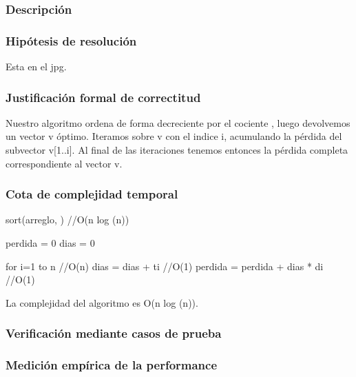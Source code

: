 \documentclass[11pt, a4paper, twoside]{article}
\begin{document}
{}

\subsubsection{Descripción}

\subsubsection{Hipótesis de resolución}
Esta en el jpg.
\subsubsection{Justificación formal de correctitud}
Nuestro algoritmo ordena de forma decreciente por el cociente \pi, luego devolvemos un vector v \'optimo. Iteramos sobre v con el indice i, acumulando la p\'erdida del subvector v[1..i]. Al final de las iteraciones tenemos entonces la p\'erdida completa correspondiente al vector v.
\subsubsection{Cota de complejidad temporal}
sort(arreglo, \pi) //O(n log (n))

perdida = 0
dias = 0

for i=1 to n    //O(n)
    dias = dias + ti    //O(1)
    perdida = perdida + dias * di   //O(1)

La complejidad del algoritmo es O(n log (n)).


\subsubsection{Verificación mediante casos de prueba}

\subsubsection{Medición empírica de la performance}

\end{document}
